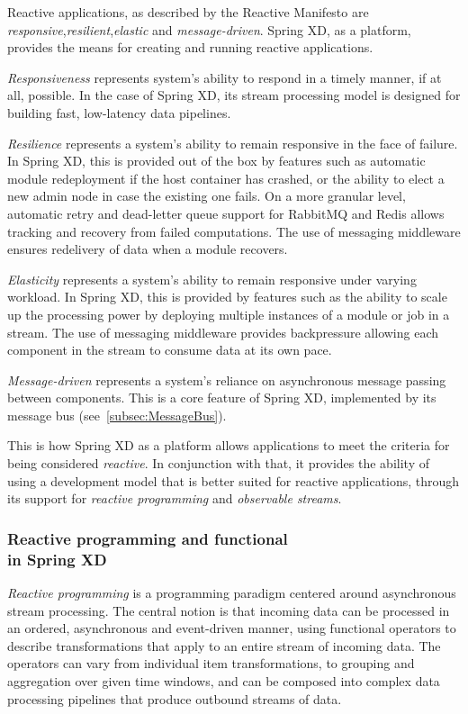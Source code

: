 Reactive applications, as described by the Reactive Manifesto
\cite{reactive} are \emph{responsive},\emph{resilient},\emph{elastic}
and \emph{message-driven}. Spring XD, as a platform, provides the means for creating and
running reactive applications.

\emph{Responsiveness} represents system's ability to respond in a timely manner, if
at all, possible. In the case of Spring XD, its stream processing model is designed
for building fast, low-latency data pipelines.

\emph{Resilience} represents a system's ability to remain responsive in the face of
failure. In Spring XD, this is provided out of the box by features such as automatic
module redeployment if the host container has crashed, or the ability to elect a new
admin node in case the existing one fails. On a more granular level, automatic retry
and dead-letter queue support for RabbitMQ and Redis allows tracking and recovery
from failed computations. The use of messaging middleware ensures redelivery of data
when a module recovers.

\emph{Elasticity} represents a system's ability to remain responsive under varying
workload. In Spring XD, this is provided by features such as the ability to scale up
the processing power by deploying multiple instances of a module or job in a stream.
The use of messaging middleware provides backpressure allowing each component in the
stream to consume data at its own pace.

\emph{Message-driven} represents a system's reliance on \linebreak
asynchronous message passing between components. This is a core
feature of Spring XD, implemented by its message bus (see~\ref{subsec:MessageBus}).

This is how Spring XD as a platform allows applications to meet the criteria for being
considered \emph{reactive}. In conjunction with that, it provides the ability of using
a development model that is better suited for reactive applications, through its support
for \emph{reactive programming} and \emph{observable streams}.

\subsubsection {Reactive programming and functional \\ in Spring XD}

\emph{Reactive programming} is a programming paradigm centered around asynchronous
stream processing. The central notion is that incoming data can be processed in an
ordered, asynchronous and event-driven manner, using functional operators to describe
transformations that apply to an entire stream of incoming data. The operators can
vary from individual item transformations, to grouping and aggregation over given
time windows, and can be composed into complex data processing pipelines that produce
outbound streams of data.

